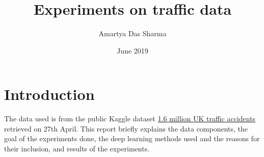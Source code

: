 \documentclass[a4paper, 12pt]{article}
\begin{document}
\title{Experiments on traffic data}

\author{Amartya Das Sharma}
\date{June 2019}
\maketitle

\section{Introduction}
The data used is from the public Kaggle dataset \href{https://www.kaggle.com/daveianhickey/2000-16-traffic-flow-england-scotland-wales/version/10}{1.6 million UK traffic accidents} retrieved on 27th April. This report briefly explains the data components, the goal of the experiments done, the deep learning methods used and the reasons for their inclusion, and results of the experiments.
\end{document}
